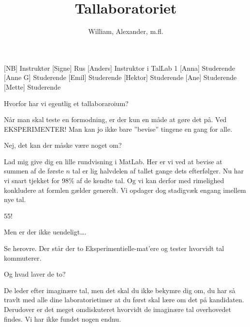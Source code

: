 \documentclass[a4paper,11pt]{article}
\title{Tallaboratoriet}
\author{William, Alexander, m.fl.}
\begin{document}
\maketitle

\begin{roles}
[NB] Instruktør
[Signe] Rus
[Anders] Instruktor i TalLab 1
[Anna] Studerende
[Anne G] Studerende
[Emil] Studerende
[Hektor] Studerende
[Ane] Studerende
[Mette] Studerende

\end{roles}

\begin{sketch}



 Hvorfor har vi egentlig et tallaboraroium?

 Når man skal teste en formodning, er der kun en måde at gøre det på. Ved EKSPERIMENTER! Man kan jo ikke bare ”bevise” tingene en gang for alle.

 Nej, det kan der måske være noget om?

 Lad mig give dig en lille rundvisning i MatLab. Her er vi ved at bevise at summen af de første $n$ tal er lig halvdelen af tallet gange dets efterfølger.  Nu har vi snart tjekket for 98\% af de kendte tal. Og vi kan derfor med rimelighed konkludere at formlen gælder generelt. Vi opdager dog stadigvæk engang imellem nye tal. 

 55!

 Men er der ikke uendeligt…. 

 Se herovre. Der står der to Eksperimentielle-mat’ere og tester hvorvidt tal kommuterer.


 Og hvad laver de to?


 De leder efter imaginære tal, men det skal du ikke bekymre dig om, du har så travlt med alle dine laboratorietimer at du først skal lære om det på kandidaten. Derudover er det meget omdiskuteret hvorvidt de imaginære tal overhovedet findes. Vi har ikke fundet nogen endnu.


\end{sketch}
\end{document}
